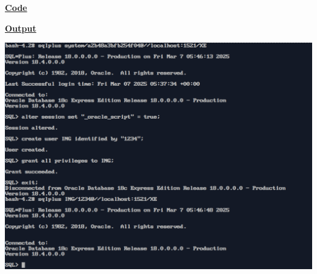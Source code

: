 
\textbf{\underline{Code}}


\vspace{1cm}
\textbf{\underline{Output}}
\vspace{1cm}
\begin{center}
    \includegraphics[height=0.5\textheight]{Questions/q1/q1.png}
\end{center}



